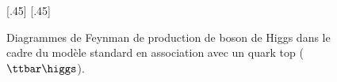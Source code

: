 \begin{figure}[p]
\vspace{2\baselineskip}

\subcaptionbox{\label{subfig-fgraph-Higgs_with_t_qq_g_tth}}[.45\textwidth]
{\vspace{\baselineskip}}
\hfill
\subcaptionbox{\label{subfig-fgraph-Higgs_with_t_gg_htt}}[.45\textwidth]
{\vspace{\baselineskip}}
\caption[Production de boson de Higgs en association avec un quark top.]{Diagrammes de Feynman de production de boson de Higgs dans le cadre du modèle standard en association avec un quark top ($\ttbar\higgs$).}
\label{fig-fgraph-Higgs_prod_with_t}
\end{figure}
